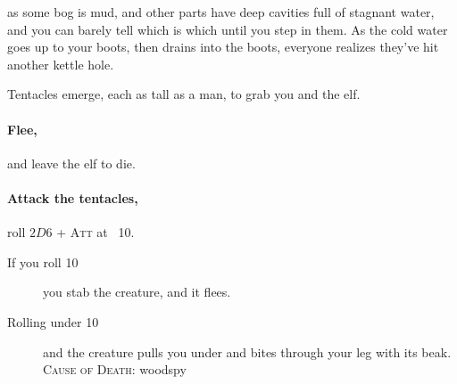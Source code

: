 as some bog is mud, and other parts have deep cavities full of stagnant water, and you can barely tell which is which until you step in them.
As the cold water goes up to your boots, then drains into the boots, everyone realizes they've hit another kettle hole.

Tentacles emerge, each as tall as a man, to grab you and the elf.

\paragraph{Flee,}
and leave the elf to die.

\paragraph{Attack the tentacles,}
roll $2D6$ + {\scshape Att} at ~10.

\begin{description}
  \item[If you roll 10]
  you stab the creature, and it flees.
  \item[Rolling under 10]
  and the creature pulls you under and bites through your leg with its beak.
  {\scshape Cause of Death:} \gls{woodspy}
\end{description}
